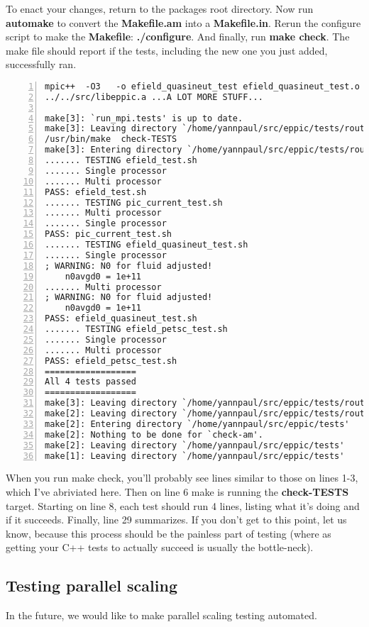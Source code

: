 To enact your changes, return to the packages root directory. Now run
\textbf{automake} to convert the \textbf{Makefile.am} into a
\textbf{Makefile.in}. Rerun the configure script to make the
\textbf{Makefile}: \textbf{./configure}. And finally, run \textbf{make
  check}. The make file should report if the tests, including the new
one you just added, successfully ran. 
\begin{lstlisting}[caption=A typical result of running 'make check',numbers=left,stepnumber=2]
mpic++  -O3   -o efield_quasineut_test efield_quasineut_test.o 
../../src/libeppic.a ...A LOT MORE STUFF...

make[3]: `run_mpi.tests' is up to date.
make[3]: Leaving directory `/home/yannpaul/src/eppic/tests/routines'
/usr/bin/make  check-TESTS
make[3]: Entering directory `/home/yannpaul/src/eppic/tests/routines'
....... TESTING efield_test.sh
....... Single processor
....... Multi processor
PASS: efield_test.sh
....... TESTING pic_current_test.sh
....... Multi processor
....... Single processor
PASS: pic_current_test.sh
....... TESTING efield_quasineut_test.sh
....... Single processor
; WARNING: N0 for fluid adjusted!
	n0avgd0 = 1e+11
....... Multi processor
; WARNING: N0 for fluid adjusted!
	n0avgd0 = 1e+11
PASS: efield_quasineut_test.sh
....... TESTING efield_petsc_test.sh
....... Single processor
....... Multi processor
PASS: efield_petsc_test.sh
==================
All 4 tests passed
==================
make[3]: Leaving directory `/home/yannpaul/src/eppic/tests/routines'
make[2]: Leaving directory `/home/yannpaul/src/eppic/tests/routines'
make[2]: Entering directory `/home/yannpaul/src/eppic/tests'
make[2]: Nothing to be done for `check-am'.
make[2]: Leaving directory `/home/yannpaul/src/eppic/tests'
make[1]: Leaving directory `/home/yannpaul/src/eppic/tests'
\end{lstlisting}
When you run make check, you'll probably see lines similar to those on
lines 1-3, which I've abriviated here. Then on line 6 make is running
the \textbf{check-TESTS} target. Starting on line 8, each test should
run 4 lines, listing what it's doing and if it succeeds. Finally, line
29 summarizes. If you don't get to this point, let us know, because
this process should be the painless part of testing (where as getting
your C++ tests to actually succeed is usually the bottle-neck).

\subsection{Testing parallel scaling}\label{ss:testing_scaling}
In the future, we would like to make parallel scaling testing
automated.

